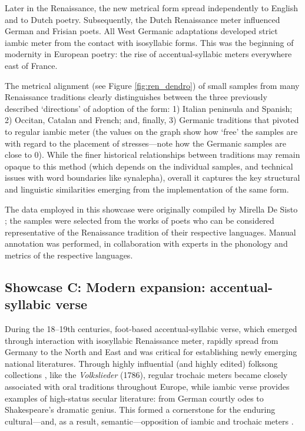 \documentclass[
    hf
]{ceurart}
\begin{document}
Later in the Renaissance, the new metrical form spread independently to English and to Dutch poetry. Subsequently, the Dutch Renaissance meter influenced German and Frisian poets. All West Germanic adaptations developed strict iambic meter from the contact with isosyllabic forms. This was the beginning of modernity in European poetry: the rise of accentual-syllabic meters everywhere east of France.

The metrical alignment (see Figure \ref{fig:ren_dendro}) of small samples from many Renaissance traditions clearly distinguishes between the three previously described ‘directions’ of adoption of the form: 1) Italian peninsula and Spanish; 2) Occitan, Catalan and French; and, finally, 3) Germanic traditions that pivoted to regular iambic meter (the values on the graph show how ‘free’ the samples are with regard to the placement of stresses---note how the Germanic samples are close to 0). While the finer historical relationships between traditions may remain opaque to this method (which depends on the individual samples, and technical issues with word boundaries like synalepha), overall it captures the key structural and linguistic similarities emerging from the implementation of the same form.

The data employed in this showcase were originally compiled by Mirella De Sisto \cite{de_sisto_interaction_2020}; the samples were selected from the works of poets who can be considered representative of the Renaissance tradition of their respective languages. Manual annotation was performed, in collaboration with experts in the phonology and metrics of the respective languages.

\subsection*{Showcase C: Modern expansion: accentual-syllabic verse}

During the 18--19th centuries, foot-based accentual-syllabic verse, which emerged through interaction with isosyllabic Renaissance meter, rapidly spread from Germany to the North and East \cite[207-209]{gasparov_history_1996} \cite{kazartsev_iambic_2022} and was critical for establishing newly emerging national literatures. Through highly influential (and highly edited) folksong collections  \cite{abrahams_phantoms_1993,leerssen_oral_2012}, like the \textit{Volkslieder} (1786), regular trochaic meters became closely associated with oral traditions throughout Europe, while iambic verse provides examples of high-status secular literature: from German courtly odes to Shakespeare's dramatic genius. This formed a cornerstone for the  enduring cultural---and, as a result, semantic---opposition of iambic and trochaic meters \cite{sela_semantics_2022}.
\end{document}
